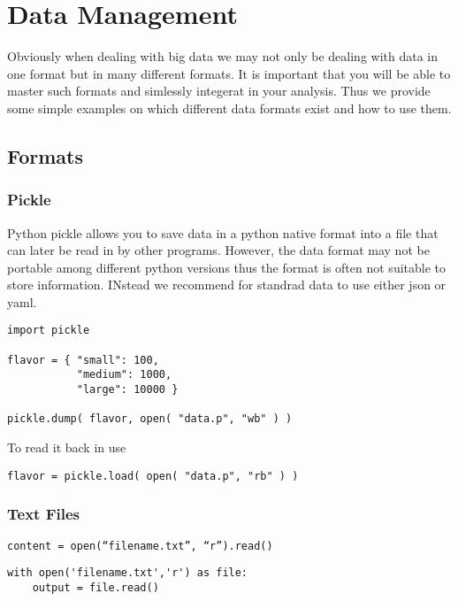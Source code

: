 \chapter{Data Management}

\FILENAME

Obviously when dealing with big data we may not only be dealing with
data in one format but in many different formats. It is important that
you will be able to master such formats and simlessly integerat in
your analysis. Thus we provide some simple examples on which different
data formats exist and how to use them.

\section{Formats}

\subsection{Pickle}

Python pickle allows you to save data in a python native format into a file
that can later be read in by other programs. However, the data format
may not be portable among different python versions thus the format is
often not suitable to store information. INstead we recommend for
standrad data to use either json or yaml.

\begin{verbatim}
import pickle

flavor = { "small": 100, 
           "medium": 1000,
           "large": 10000 }

pickle.dump( flavor, open( "data.p", "wb" ) )

\end{verbatim}

To read it back in use

\begin{verbatim}
flavor = pickle.load( open( "data.p", "rb" ) )
\end{verbatim}

\subsection{Text Files}

\begin{verbatim}
content = open(“filename.txt”, “r”).read() 
\end{verbatim}

\begin{verbatim}
with open('filename.txt','r') as file:
    output = file.read()
\end{verbatim}

